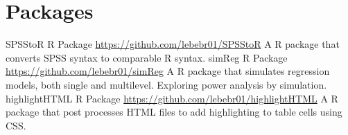\documentclass[]{friggeri-cv} %
\begin{document}

\section{Packages}

\begin{entrylist}
\entry
{SPSStoR}
{R Package}
{\href{https://github.com/lebebr01/SPSStoR}{https://github.com/lebebr01/SPSStoR}}
{A R package that converts SPSS syntax to comparable R syntax.}
\entry
{simReg}
{R Package}
{\href{https://github.com/lebebr01/simReg}{https://github.com/lebebr01/simReg}}
{A R package that simulates regression models, both single and multilevel.
Exploring power analysis by simulation.}
\entry
{highlightHTML}
{R Package}
{\href{https://github.com/lebebr01/highlightHTML}{https://github.com/lebebr01/highlightHTML}}
{A R package that post processes HTML files to add highlighting to table cells using CSS.}
\end{entrylist}




\end{document}
